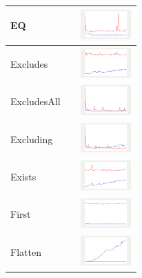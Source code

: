 \begin{longtable}{ m{2.5cm} m{8cm} m{2cm} }
EQ &

&
\includegraphics[width=2cm]{graphs/sequence/small/EQ}
\\\hline

Excludes &

&
\includegraphics[width=2cm]{graphs/sequence/small/Excludes}
\\\hline

ExcludesAll &

&
\includegraphics[width=2cm]{graphs/sequence/small/ExcludesAll}
\\\hline

Excluding &

&
\includegraphics[width=2cm]{graphs/sequence/small/Excluding}
\\\hline

Exists &

&
\includegraphics[width=2cm]{graphs/sequence/small/Exists}
\\\hline

First &

&
\includegraphics[width=2cm]{graphs/sequence/small/First}
\\\hline

Flatten &

&
\includegraphics[width=2cm]{graphs/sequence/small/Flatten}
\\\hline


\end{longtable}
